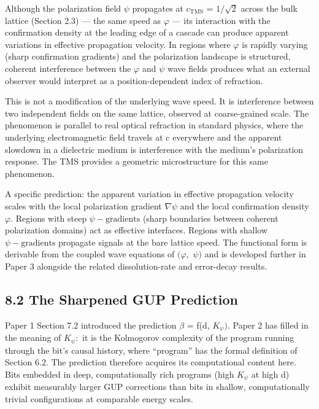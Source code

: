 \documentclass[11pt,oneside]{report}
\theoremstyle{definition}
\theoremstyle{remark}
\begin{document}
Although the polarization field \ensuremath{\psi} propagates at \ensuremath{c_{\mathrm{TMS}}} = \ensuremath{1/\sqrt{2}} across the
bulk lattice (Section 2.3) --- the same speed as \ensuremath{\varphi} --- its interaction
with the confirmation density at the leading edge of a cascade can
produce apparent variations in effective propagation velocity. In
regions where \ensuremath{\varphi} is rapidly varying (sharp confirmation gradients) and
the polarization landscape is structured, coherent interference between
the \ensuremath{\varphi} and \ensuremath{\psi} wave fields produces what an external observer would
interpret as a position-dependent index of refraction.

This is not a modification of the underlying wave speed. It is
interference between two independent fields on the same lattice,
observed at coarse-grained scale. The phenomenon is parallel to real
optical refraction in standard physics, where the underlying
electromagnetic field travels at c everywhere and the apparent slowdown
in a dielectric medium is interference with the medium's polarization
response. The TMS provides a geometric microstructure for this same
phenomenon.

A specific prediction: the apparent variation in effective propagation
velocity scales with the local polarization gradient
\textbar\ensuremath{\nabla \psi}\textbar{} and the local confirmation density \ensuremath{\varphi .} Regions with
steep \ensuremath{\psi -\text{gradients}} (sharp boundaries between coherent polarization
domains) act as effective interfaces. Regions with shallow \ensuremath{\psi -\text{gradients}}
propagate signals at the bare lattice speed. The functional form is
derivable from the coupled wave equations of \ensuremath{(\varphi ,} \ensuremath{\psi )} and is developed
further in Paper 3 alongside the related dissolution-rate and
error-decay results.

\subsection*{8.2 The Sharpened GUP Prediction}

Paper 1 Section 7.2 introduced the prediction \ensuremath{\beta} = f(d, \ensuremath{K_{\psi}).} Paper 2
has filled in the meaning of \ensuremath{K_{\psi}:} it is the Kolmogorov complexity of
the program running through the bit's causal history, where ``program''
has the formal definition of Section 6.2. The prediction therefore
acquires its computational content here. Bits embedded in deep,
computationally rich programs (high \ensuremath{K_{\psi}} at high d) exhibit measurably
larger GUP corrections than bits in shallow, computationally trivial
configurations at comparable energy scales.
\end{document}
